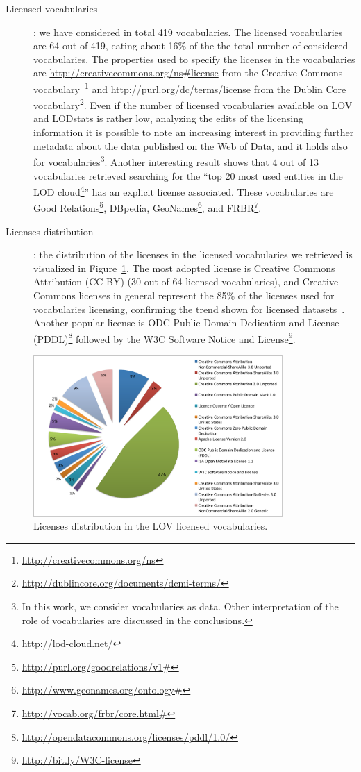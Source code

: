 \begin{description}
\item[Licensed vocabularies]: we have considered in total 419 vocabularies. The licensed vocabularies are 64 out of 419, eating about 16\% of the the total number of considered vocabularies. The properties used to specify the licenses in the vocabularies are \url{http://creativecommons.org/ns\#license} from the Creative Commons vocabulary~\footnote{\url{http://creativecommons.org/ns}} and \url{http://purl.org/dc/terms/license} from the Dublin Core vocabulary\footnote{\url{http://dublincore.org/documents/dcmi-terms/}}. Even if the number of licensed vocabularies available on LOV and LODstats is rather low, analyzing the edits of the licensing information it is possible to note an increasing interest in providing further metadata about the data published on the Web of Data, and it holds also for vocabularies\footnote{In this work, we consider vocabularies as data. Other interpretation of the role of vocabularies are discussed in the conclusions.}. Another interesting result shows that 4 out of 13 vocabularies retrieved searching for the ``top 20 most used entities in the LOD cloud\footnote{\url{http://lod-cloud.net/}}'' has an explicit license associated. These vocabularies are Good Relations\footnote{\url{http://purl.org/goodrelations/v1\#}}, DBpedia, GeoNames\footnote{\url{http://www.geonames.org/ontology\#}}, and FRBR\footnote{\url{http://vocab.org/frbr/core.html\#}}.
\item[Licenses distribution]: the distribution of the licenses in the licensed vocabularies we retrieved is visualized in Figure~\ref{fig:LOVstats}. The most adopted license is Creative Commons Attribution (CC-BY) (30 out of 64 licensed vocabularies), and Creative Commons licenses in general represent the 85\% of the licenses used for vocabularies licensing, confirming the trend shown for licensed datasets~\cite{DBLP:conf/semweb/Rodriguez-DoncelGM13,DBLP:conf/semweb/GovernatoriRVG13}. Another popular license is ODC Public Domain Dedication and License (PDDL)\footnote{\url{http://opendatacommons.org/licenses/pddl/1.0/}} followed by the W3C Software Notice and License\footnote{\url{http://bit.ly/W3C-license}}.
\end{description}

\begin{figure}
\centering
\includegraphics[width=9.5cm]{img/LOV-stats.pdf}
\caption{Licenses distribution in the LOV licensed vocabularies.}
\label{fig:LOVstats}
\end{figure}

